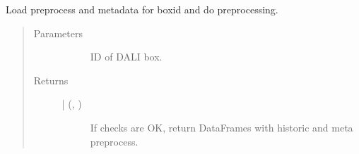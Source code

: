 \documentclass[letterpaper,10pt,english]{sphinxmanual}
\begin{document}
\begin{fulllineitems}
\label{\detokenize{autoapi/src/preprocess/preprocess/index:src.preprocess.preprocess.load_data}}
Load preprocess and metadata for boxid and do preprocessing.
\begin{quote}\begin{description}
\item[{Parameters}] \leavevmode\begin{description}
\item[{}] \leavevmode
ID of DALI box.

\end{description}

\item[{Returns}] \leavevmode\begin{description}
\item[{ | (, )}] \leavevmode
If checks are OK, return DataFrames with historic and meta preprocess.

\end{description}

\end{description}\end{quote}

\end{fulllineitems}


\begin{fulllineitems}
\label{\detokenize{autoapi/src/preprocess/preprocess/index:src.preprocess.preprocess.format_data}}
\end{fulllineitems}

\end{document}
